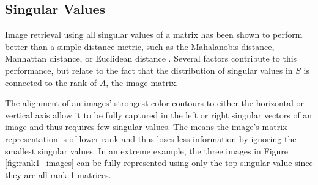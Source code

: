 \documentclass{report}
\begin{document}
\subsection{Singular Values}

Image retrieval using all singular values of a matrix has been shown to perform better than a simple distance metric, such as the Mahalanobis distance, Manhattan distance, or Euclidean distance \cite{svd_image_retrieval}. Several factors contribute to this performance, but relate to the fact that the distribution of singular values in $S$ is connected to the rank of $A$, the image matrix. 

The alignment of an images' strongest color contours to either the horizontal or vertical axis allow it to be fully captured in the left or right singular vectors of an image and thus requires few singular values. The means the image's matrix representation is of lower rank and thus loses less information by ignoring the smallest singular values. In an extreme example, the three images in Figure \ref{fig:rank1_images} can be fully represented using only the top singular value since they are all rank 1 matrices.
\end{document}
